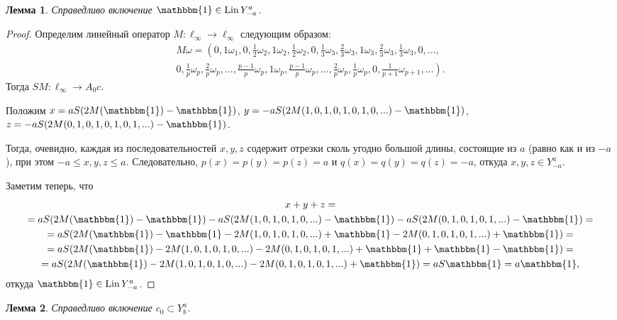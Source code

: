 \documentclass[a4paper,14pt]{article} %
\theoremstyle{plain}
\newtheorem{lemma}{Лемма}[section]
\begin{document}
\begin{lemma}
	\label{lem:const_Lin_alpha_0_a_eq_-b}
	Справедливо включение
	$\mathbbm{1}\in \operatorname{Lin} Y^a_{-a}$.
\end{lemma}

\begin{proof}
	Определим линейный оператор $M:\ell_\infty \to \ell_\infty$ следующим образом:
	\begin{multline}
		M\omega=\left(
			0, 1\omega_1,
			0, \frac{1}{2}\omega_2, 1\omega_2, \frac{1}{2}\omega_2,
			0, \frac{1}{3}\omega_3, \frac{2}{3}\omega_3, 1\omega_3, \frac{2}{3}\omega_3, \frac{1}{3}\omega_3,
			0, ...,
		\right. \\ \left.
			0, \frac{1}{p}\omega_p, \frac{2}{p}\omega_p, ..., \frac{p-1}{p}\omega_p, 1\omega_p,
				\frac{p-1}{p}\omega_p, ..., \frac{2}{p}\omega_p, \frac{1}{p}\omega_p,
			0, \frac{1}{p+1}\omega_{p+1}, ...
		\right)
		.
	\end{multline}
	Тогда $SM: \ell_\infty \to A_0 c$.

	Положим $x=aS(2M(\mathbbm{1})-\mathbbm{1})$,
	$y=-aS(2M(1,0,1,0,1,0,1,0,...)-\mathbbm{1})$,
	$z=-aS(2M(0,1,0,1,0,1,0,1,...)-\mathbbm{1})$.

	Тогда, очевидно, каждая из последовательностей $x,y,z$ содержит отрезки сколь угодно большой длины,
	состоящие из $a$ (равно как и из $-a$), при этом $-a \leq x,y,z \leq a$.
	Следовательно, $p(x)=p(y)=p(z) = a$ и $q(x)=q(y)=q(z) = -a$,
	откуда $x,y,z \in Y^a_{-a}$.

	Заметим теперь, что
	\begin{multline}
		x + y + z
		=
		\\=
		aS(2M(\mathbbm{1})-\mathbbm{1}) - aS(2M(1,0,1,0,1,0,...)-\mathbbm{1}) - aS(2M(0,1,0,1,0,1,...)-\mathbbm{1})
		=
		\\=
		aS(2M(\mathbbm{1})-\mathbbm{1}  -    2M(1,0,1,0,1,0,...)+\mathbbm{1}  -    2M(0,1,0,1,0,1,...)+\mathbbm{1})
		=
		\\=
		aS(2M(\mathbbm{1}) - 2M(1,0,1,0,1,0,...) - 2M(0,1,0,1,0,1,...)+\mathbbm{1}+\mathbbm{1}-\mathbbm{1})
		=
		\\=
		aS(2M(\mathbbm{1}) - 2M(1,0,1,0,1,0,...) - 2M(0,1,0,1,0,1,...)+\mathbbm{1})
		=
		aS\mathbbm{1}
		=
		a\mathbbm{1}
		,
	\end{multline}
	откуда $\mathbbm{1} \in \operatorname{Lin} Y^a_{-a}$.
\end{proof}


\begin{lemma}
	\label{lem:c_0_Lin_alpha_0}
	Справедливо включение $c_0 \subset Y^a_b$.
\end{lemma}
\end{document}
